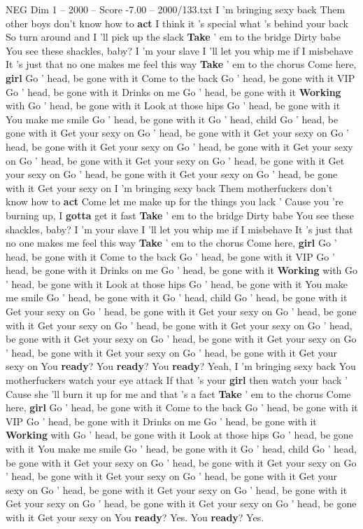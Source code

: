 \begin{textsample}{NEG Dim 1 – 2000 – Score -7.00 – 2000/133.txt}  \label{ex:f1_neg_020}
I 'm bringing sexy back Them other boys don't know how to \textbf{act} I think it 's special what 's behind your back So turn around and I 'll pick up the slack \textbf{Take} ' em to the bridge Dirty babe You see these shackles, baby?
I 'm your slave I 'll let you whip me if I misbehave It 's just that no one makes me feel this way \textbf{Take} ' em to the chorus Come here, \textbf{girl} Go ' head, be gone with it Come to the back Go ' head, be gone with it VIP Go ' head, be gone with it Drinks on me Go ' head, be gone with it \textbf{Working} with Go ' head, be gone with it Look at those hips Go ' head, be gone with it You make me smile Go ' head, be gone with it Go ' head, child Go ' head, be gone with it Get your sexy on Go ' head, be gone with it Get your sexy on Go ' head, be gone with it Get your sexy on Go ' head, be gone with it Get your sexy on Go ' head, be gone with it Get your sexy on Go ' head, be gone with it Get your sexy on Go ' head, be gone with it Get your sexy on Go ' head, be gone with it Get your sexy on I 'm bringing sexy back Them motherfuckers don't know how to \textbf{act} Come let me make up for the things you lack ' Cause you 're burning up, I \textbf{gotta} get it fast \textbf{Take} ' em to the bridge Dirty babe You see these shackles, baby?
I 'm your slave I 'll let you whip me if I misbehave It 's just that no one makes me feel this way \textbf{Take} ' em to the chorus Come here, \textbf{girl} Go ' head, be gone with it Come to the back Go ' head, be gone with it VIP Go ' head, be gone with it Drinks on me Go ' head, be gone with it \textbf{Working} with Go ' head, be gone with it Look at those hips Go ' head, be gone with it You make me smile Go ' head, be gone with it Go ' head, child Go ' head, be gone with it Get your sexy on Go ' head, be gone with it Get your sexy on Go ' head, be gone with it Get your sexy on Go ' head, be gone with it Get your sexy on Go ' head, be gone with it Get your sexy on Go ' head, be gone with it Get your sexy on Go ' head, be gone with it Get your sexy on Go ' head, be gone with it Get your sexy on You \textbf{ready}?
You \textbf{ready}?
You \textbf{ready}?
Yeah, I 'm bringing sexy back You motherfuckers watch your eye attack If that 's your \textbf{girl} then watch your back ' Cause she 'll burn it up for me and that 's a fact \textbf{Take} ' em to the chorus Come here, \textbf{girl} Go ' head, be gone with it Come to the back Go ' head, be gone with it VIP Go ' head, be gone with it Drinks on me Go ' head, be gone with it \textbf{Working} with Go ' head, be gone with it Look at those hips Go ' head, be gone with it You make me smile Go ' head, be gone with it Go ' head, child Go ' head, be gone with it Get your sexy on Go ' head, be gone with it Get your sexy on Go ' head, be gone with it Get your sexy on Go ' head, be gone with it Get your sexy on Go ' head, be gone with it Get your sexy on Go ' head, be gone with it Get your sexy on Go ' head, be gone with it Get your sexy on Go ' head, be gone with it Get your sexy on You \textbf{ready}?
Yes.
You \textbf{ready}?
Yes.

\end{textsample}
